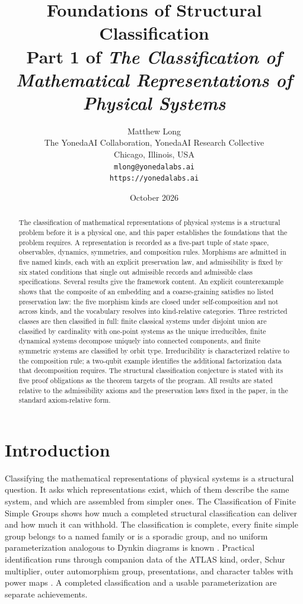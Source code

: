 \documentclass[11pt,letterpaper]{article}
\title{Foundations of Structural Classification\\[4pt]
  {\normalsize Part 1 of \emph{The Classification of Mathematical Representations of Physical Systems}}}
\author{Matthew Long\\
  \small The YonedaAI Collaboration, YonedaAI Research Collective\\
  \small Chicago, Illinois, USA\\
  \small \texttt{mlong@yonedalabs.ai}\\
  \small \texttt{https://yonedalabs.ai}}
\date{October 2026}
\theoremstyle{definition}
\theoremstyle{remark}
\begin{document}
\maketitle

\begin{abstract}
The classification of mathematical representations of physical systems is a structural problem before it is a physical one, and this paper establishes the foundations that the problem requires. A representation is recorded as a five-part tuple of state space, observables, dynamics, symmetries, and composition rules. Morphisms are admitted in five named kinds, each with an explicit preservation law, and admissibility is fixed by six stated conditions that single out admissible records and admissible class specifications. Several results give the framework content. An explicit counterexample shows that the composite of an embedding and a coarse-graining satisfies no listed preservation law: the five morphism kinds are closed under self-composition and not across kinds, and the vocabulary resolves into kind-relative categories. Three restricted classes are then classified in full: finite classical systems under disjoint union are classified by cardinality with one-point systems as the unique irreducibles, finite dynamical systems decompose uniquely into connected components, and finite symmetric systems are classified by orbit type. Irreducibility is characterized relative to the composition rule; a two-qubit example identifies the additional factorization data that decomposition requires. The structural classification conjecture is stated with its five proof obligations as the theorem targets of the program. All results are stated relative to the admissibility axioms and the preservation laws fixed in the paper, in the standard axiom-relative form.
\end{abstract}

\section{Introduction}

Classifying the mathematical representations of physical systems is a structural question. It asks which representations exist, which of them describe the same system, and which are assembled from simpler ones. The Classification of Finite Simple Groups shows how much a completed structural classification can deliver and how much it can withhold. The classification is complete, every finite simple group belongs to a named family or is a sporadic group, and no uniform parameterization analogous to Dynkin diagrams is known \cite{gorenstein1982,solomon2001}. Practical identification runs through companion data of the ATLAS kind, order, Schur multiplier, outer automorphism group, presentations, and character tables with power maps \cite{atlas-book}. A completed classification and a usable parameterization are separate achievements.
\end{document}
